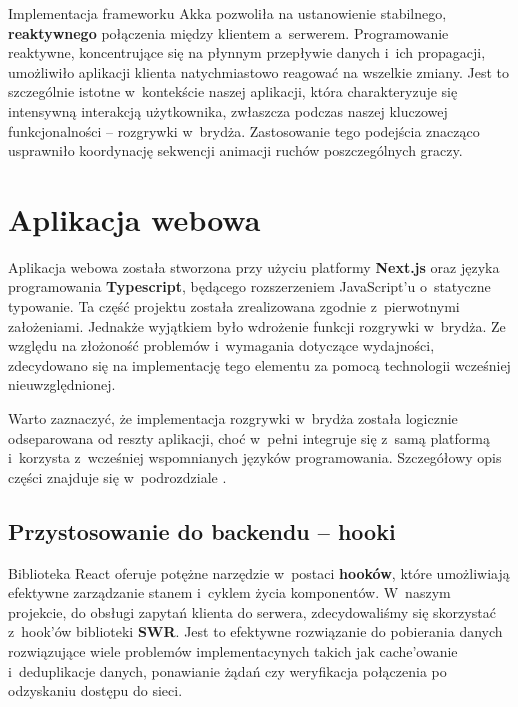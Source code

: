 Implementacja frameworku Akka pozwoliła na ustanowienie stabilnego,
\textbf{reaktywnego} połączenia między klientem a~serwerem. Programowanie
reaktywne, koncentrujące się na płynnym przepływie danych i~ich propagacji,
umożliwiło aplikacji klienta natychmiastowo reagować na wszelkie zmiany. Jest
to szczególnie istotne w~kontekście naszej aplikacji, która charakteryzuje
się intensywną interakcją użytkownika, zwłaszcza podczas naszej kluczowej
funkcjonalności -- rozgrywki w~brydża. Zastosowanie tego podejścia
znacząco usprawniło koordynację sekwencji animacji ruchów poszczególnych
graczy.


\section{Aplikacja webowa}
Aplikacja webowa została stworzona przy użyciu platformy \textbf{Next.js} oraz
języka programowania \textbf{Typescript}, będącego rozszerzeniem JavaScript'u
o~statyczne typowanie. Ta część projektu została zrealizowana zgodnie
z~pierwotnymi założeniami. Jednakże wyjątkiem było wdrożenie funkcji
rozgrywki w~brydża. Ze względu na złożoność problemów i~wymagania
dotyczące wydajności, zdecydowano się na implementację tego elementu za
pomocą technologii wcześniej nieuwzględnionej.

Warto zaznaczyć, że implementacja rozgrywki w~brydża została logicznie
odseparowana od reszty aplikacji, choć w~pełni integruje się z~samą
platformą i~korzysta z~wcześniej wspomnianych języków programowania.
Szczegółowy opis części znajduje się w~podrozdziale .

\subsection{Przystosowanie do backendu -- hooki}
Biblioteka React oferuje potężne narzędzie w~postaci \textbf{hooków},
które umożliwiają efektywne zarządzanie stanem i~cyklem życia komponentów.
W~naszym projekcie, do obsługi zapytań klienta do serwera, zdecydowaliśmy się
skorzystać z~hook'ów biblioteki \textbf{SWR}. Jest to efektywne rozwiązanie do
pobierania danych rozwiązujące wiele problemów implementacynych takich jak
cache'owanie i~deduplikacje danych, ponawianie żądań czy weryfikacja połączenia
po odzyskaniu dostępu do sieci.

